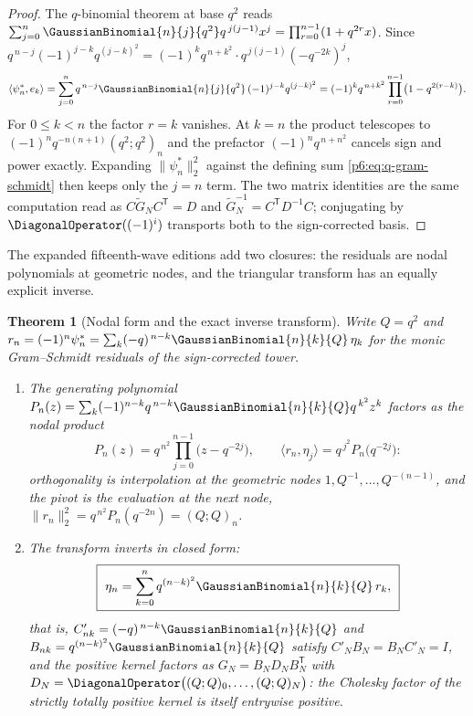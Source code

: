 \documentclass[11pt,oneside]{article}
\numberwithin{equation}{section}
\newtheorem{theorem}{Theorem}[section]
\theoremstyle{definition}
\theoremstyle{remark}
\begin{document}
\begin{proof}
The $q$-binomial theorem at base $q^2$ reads
$\sum_{j=0}^n\GaussianBinomial{n}{j}{q^2}q^{\,j(j-1)}x^j=\prod_{r=0}^{n-1}(1+q^{2r}x)$.
Since $q^{\,n-j}(-1)^{j-k}q^{(j-k)^2}
=(-1)^kq^{\,n+k^2}\cdot q^{\,j(j-1)}(-q^{-2k})^j$,
\[
 \langle\psi_n^{\ast},e_k\rangle
 =\sum_{j=0}^{n}q^{\,n-j}\GaussianBinomial{n}{j}{q^2}\,(-1)^{j-k}q^{(j-k)^2}
 =(-1)^kq^{\,n+k^2}\prod_{r=0}^{n-1}\bigl(1-q^{2(r-k)}\bigr).
\]
For $0\le k<n$ the factor $r=k$ vanishes.  At $k=n$ the product telescopes
to $(-1)^nq^{-n(n+1)}(q^2;q^2)_n$ and the prefactor $(-1)^nq^{\,n+n^2}$
cancels sign and power exactly.  Expanding $\|\psi_n^{\ast}\|_2^2$ against
the defining sum \eqref{p6:eq:q-gram-schmidt} then keeps only the $j=n$
term.  The two matrix identities are the same computation read as
$C\widetilde G_NC^{\mathsf T}=D$ and
$\widetilde G_N^{-1}=C^{\mathsf T}D^{-1}C$; conjugating by
$\DiagonalOperator((-1)^i)$ transports both to the sign-corrected
basis.
\end{proof}

The expanded fifteenth-wave editions add two closures: the residuals are
nodal polynomials at geometric nodes, and the triangular transform has an
equally explicit inverse.

\begin{theorem}[Nodal form and the exact inverse transform]
\label{p6:thm:gs-nodal-inverse}
Write $Q=q^2$ and
$r_n=(-1)^n\psi_n^{\ast}=\sum_{k}(-q)^{\,n-k}\GaussianBinomial{n}{k}{Q}\,\eta_k$
for the monic Gram--Schmidt residuals of the sign-corrected tower.
\begin{enumerate}
\item The generating polynomial
$P_n(z)=\sum_k(-1)^{n-k}q^{\,n-k}\GaussianBinomial{n}{k}{Q}q^{\,k^2}z^k$ factors as
the nodal product
\begin{equation}\label{p6:eq:gs-nodal}
 P_n(z)=q^{\,n^2}\prod_{j=0}^{n-1}\bigl(z-q^{-2j}\bigr),
 \qquad
 \langle r_n,\eta_j\rangle=q^{\,j^2}P_n\bigl(q^{-2j}\bigr):
\end{equation}
orthogonality is interpolation at the geometric nodes
$1,Q^{-1},\ldots,Q^{-(n-1)}$, and the pivot is the evaluation at the next
node, $\|r_n\|_2^2=q^{\,n^2}P_n(q^{-2n})=(Q;Q)_n$.
\item The transform inverts in closed form:
\begin{equation}\label{p6:eq:gs-inverse}
 \boxed{\ \eta_n=\sum_{k=0}^{n}q^{(n-k)^2}\GaussianBinomial{n}{k}{Q}\,r_k,\ }
\end{equation}
that is, $C'_{nk}=(-q)^{\,n-k}\GaussianBinomial{n}{k}{Q}$ and
$B_{nk}=q^{(n-k)^2}\GaussianBinomial{n}{k}{Q}$ satisfy $C'_NB_N=B_NC'_N=I$, and the
positive kernel factors as
$G_N=B_ND_NB_N^{\mathsf T}$ with
$D_N=\DiagonalOperator\bigl((Q;Q)_0,\ldots,(Q;Q)_N\bigr)$: the Cholesky
factor of the strictly totally positive kernel is itself entrywise
positive.
\end{enumerate}
\end{theorem}
\end{document}
